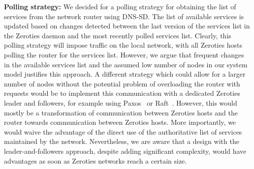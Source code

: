 \textbf{Polling strategy:}
We decided for a polling strategy for obtaining the list of services from the network router using DNS-SD.
The list of available services is updated based on changes detected between the last version of the services list in the Zeroties daemon and the most recently polled services list.
Clearly, this polling strategy will impose traffic on the local network, with all Zeroties hosts polling the router for the services list.
However, we argue that frequent changes in the available services list and the assumed low number of nodes in our system model justifies this approach.
A different strategy which could allow for a larger number of nodes without the potential problem of overloading the router with requests would be to implement this communication with a dedicated Zeroties leader and followers, for example using Paxos~\cite{lamport_2001} or Raft~\cite{ongaro_2014}.
However, this would mostly be a transformation of communication between Zeroties hosts and the router towards communication between Zeroties hosts. 
More importantly, we would waive the advantage of the direct use of the authoritative list of services maintained by the network.
Nevertheless, we are aware that a design with the leader-and-followers approach, despite adding significant complexity, would have advantages as soon as Zeroties networks reach a certain size.


